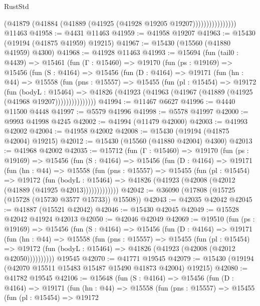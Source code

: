 \begin{lexlean}{RustStd}
\begin{coremodule}
                          (@41879 (@41884 (@41889 (@41925 (@41928 @19205 @19207))))))))))))))))
    @11463
@41958 := @4431 @11463
@41959 := @41958 @19207
@41963 := @15430 (@19194 (@41875 @41959) @19215)
@41967 := @15430 (@15560 (@41880 @41959) @4300)
@41968 := @41928 @11463
@41993 := @15694
    (fun (tail0 : @4439) =>
    @15461
      (fun (Γ : @15460) =>
      @19170
        (fun (ps : @19169) =>
        @15456
          (fun (S : @4164) =>
          @15456
            (fun (D : @4164) =>
            @19171
              (fun (hn : @44) =>
              @15558
                (fun (pns : @15557) =>
                @15455
                  (fun (pl : @15454) =>
                  @19172
                    (fun (bodyL : @15464) =>
                    @41826 (@41923 (@41963 (@41967 (@41889 (@41925 (@41968 @19207)))))))))))))))
@41994 := @11467 @6627
@41996 := @4440 @11500 @4448
@41997 := @5579 @41996
@41998 := @5578 @41997
@42000 := @9993 @41998 @4245
@42002 := @41994 (@11479 @42000)
@42003 := @41993 @42002
@42004 := @41958 @42002
@42008 := @15430 (@19194 (@41875 @42004) @19215)
@42012 := @15430 (@15560 (@41880 @42004) @4300)
@42013 := @41968 @42002
@42035 := @15712
    (fun (Γ : @15460) =>
    @19170
      (fun (ps : @19169) =>
      @15456
        (fun (S : @4164) =>
        @15456
          (fun (D : @4164) =>
          @19171
            (fun (hn : @44) =>
            @15558
              (fun (pns : @15557) =>
              @15455
                (fun (pl : @15454) =>
                @19172
                  (fun (bodyL : @15464) =>
                  @41826 (@41923 (@42008 (@42012 (@41889 (@41925 @42013)))))))))))))
@42042 := @36090 (@17808 (@15725 (@15728 (@15730 @3577 @15733)) @15508))
@42043 := @42035 @42042
@42045 := @41887 (@15521 @42042)
@42046 := @15430 @42045
@42049 := @15528 @42042 @41924 @42013
@42050 := @42046 @42049
@42069 := @19510
    (fun (ps : @19169) =>
    @15456
      (fun (S : @4164) =>
      @15456
        (fun (D : @4164) =>
        @19171
          (fun (hn : @44) =>
          @15558
            (fun (pns : @15557) =>
            @15455
              (fun (pl : @15454) =>
              @19172 (fun (bodyL : @15464) => @41826 (@41923 (@42008 (@42012 @42050))))))))))
    @19545
@42070 := @41771 @19545
@42079 := @15430 (@19194 (@42070 @15511 @15483 @15487 @15490 @41873 @42004) @19215)
@42080 := @41782 @19545
@42106 := @15648
    (fun (S : @4164) =>
    @15456
      (fun (D : @4164) =>
      @19171
        (fun (hn : @44) =>
        @15558
          (fun (pns : @15557) =>
          @15455
            (fun (pl : @15454) =>
            @19172

\end{coremodule}
\end{lexlean}
